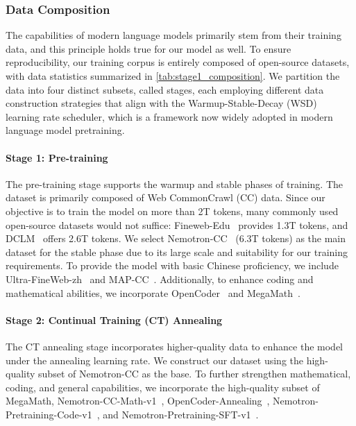 \documentclass[]{bytedance_seed}
\newcommand{\1}{\mathbf{1}}
\begin{document}
\subsubsection{Data Composition}

The capabilities of modern language models primarily stem from their training data, and this principle holds true for our model as well. To ensure reproducibility, our training corpus is entirely composed of open-source datasets, with data statistics summarized in \autoref{tab:stage1_composition}. We partition the data into four distinct subsets, called stages, each employing different data construction strategies that align with the Warmup-Stable-Decay (WSD)~\cite{wen2024understanding} learning rate scheduler, which is a framework now widely adopted in modern language model pretraining.

\paragraph{Stage 1: Pre-training}
The pre-training stage supports the warmup and stable phases of training. The dataset is primarily composed of Web CommonCrawl (CC) data. Since our objective is to train the model on more than 2T tokens, many commonly used open-source datasets would not suffice: Fineweb-Edu~\cite{penedo2024fineweb} provides 1.3T tokens, and DCLM~\cite{li2024dclm} offers 2.6T tokens. We select Nemotron-CC~\cite{su2024nemotron} (6.3T tokens) as the main dataset for the stable phase due to its large scale and suitability for our training requirements. To provide the model with basic Chinese proficiency, we include Ultra-FineWeb-zh~\cite{wang2025ultra} and MAP-CC~\cite{du2024chinese}. Additionally, to enhance coding and mathematical abilities, we incorporate OpenCoder~\cite{Huang2024OpenCoderTO} and MegaMath~\cite{zhou2025megamath}.

\paragraph{Stage 2: Continual Training (CT) Annealing}
The CT annealing stage incorporates higher-quality data to enhance the model under the annealing learning rate. We construct our dataset using the high-quality subset of Nemotron-CC as the base. To further strengthen mathematical, coding, and general capabilities, we incorporate the high-quality subset of MegaMath, Nemotron-CC-Math-v1~\cite{karimi2025nemotroncc,nvidia2025nvidianemotronnano2}, OpenCoder-Annealing~\cite{Huang2024OpenCoderTO}, Nemotron-Pretraining-Code-v1~\cite{nvidia2025nvidianemotronnano2}, and Nemotron-Pretraining-SFT-v1~\cite{nvidia2025nvidianemotronnano2}.
\end{document}
